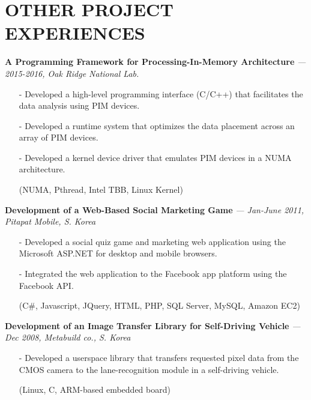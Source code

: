 \section{OTHER PROJECT EXPERIENCES} 
\vspace{0.03in}

  {\bf A Programming Framework for Processing-In-Memory Architecture}
   {\it \footnotesize --- 2015-2016, Oak Ridge National Lab.}
   \begin{itemize}[leftmargin=*]
    \setlength\itemsep{-0.02in}
    \item[-] Developed a high-level programming interface (C/C++) that
             facilitates the data analysis using PIM devices.
    \item[-] Developed a runtime system that optimizes the data placement across an array of
             PIM devices.
    \item[-] Developed a kernel device driver that emulates PIM devices in a NUMA architecture.
    \item[] {\small(NUMA, Pthread, Intel TBB, Linux Kernel)}
   \end{itemize}

  \vspace{-0.15in}
  {\bf Development of a Web-Based Social Marketing Game}
    {\it \footnotesize --- Jan-June 2011, Pitapat Mobile, S. Korea}
    \begin{itemize}[leftmargin=*]
    \setlength\itemsep{-0.02in}
     \item[-] Developed a social quiz game and marketing web application using 
              the Microsoft ASP.NET for desktop and mobile browsers.
     \item[-] Integrated the web application to the Facebook app platform using the Facebook API.
     \item[]  {\small(C\#, Javascript, JQuery, HTML, PHP, SQL Server, MySQL, Amazon EC2)}
\end{itemize}

  \vspace{-0.15in}
  {\bf Development of an Image Transfer Library for Self-Driving Vehicle}
    {\it \footnotesize --- Dec 2008, Metabuild co., S. Korea}
    \begin{itemize}[leftmargin=*]
    \setlength\itemsep{-0.02in}
     \item[-] Developed a userspace library that transfers requested pixel data
              from the CMOS camera
              to the lane-recognition module in a self-driving vehicle.
     \item[] {\small(Linux, C, ARM-based embedded board)}
\end{itemize}

